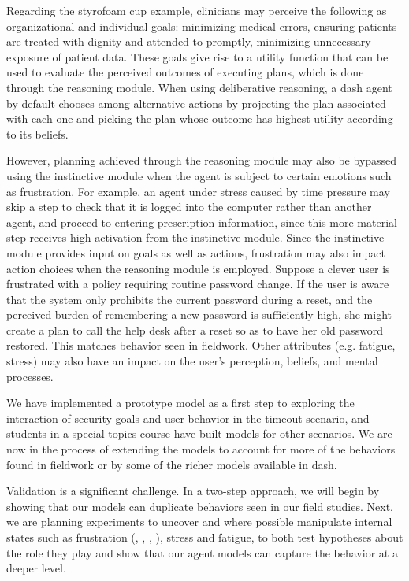 \documentclass{acm_proc_article-sp}
\newcommand{\ignore}[1] {}
\begin{document}
Regarding the styrofoam cup example, clinicians may perceive the
following as organizational and individual goals: minimizing medical
errors, ensuring patients are treated with dignity and attended to
promptly, minimizing unnecessary exposure of patient
data. \ignore{Individual goals may include things like providing
  superior patient care and finishing the current task adequately but
  quickly.}  These goals give rise to a utility function that can be
used to evaluate the perceived outcomes of executing plans, which is
done through the reasoning module. When using deliberative reasoning,
a {\sc dash} agent by default chooses among alternative actions by
projecting the plan associated with each one and picking the plan
whose outcome has highest utility according to its beliefs.

However, planning achieved through the reasoning module may also be
bypassed using the instinctive module when the agent is subject to
certain emotions such as frustration. For example, an agent under
stress caused by time pressure may skip a step to check that it is
logged into the computer rather than another agent, and proceed to
entering prescription information, since this more material step
receives high activation from the instinctive module. Since the
instinctive module provides input on goals as well as actions,
frustration may also impact action choices when the reasoning module
is employed. Suppose a clever user is frustrated with a policy
requiring routine password change. If the user is aware that the
system only prohibits the current password during a reset, and the
perceived burden of remembering a new password is sufficiently high,
she might create a plan to call the help desk after a reset so as to
have her old password restored. This matches behavior seen in
fieldwork.  Other attributes (e.g. fatigue, stress) may also have an
impact on the user's perception, beliefs, and mental processes.
 
We have implemented a prototype model as a first step to exploring the
interaction of security goals and user behavior in the timeout
scenario, and students in a special-topics course have built models
for other scenarios. We are now in the process of extending the models
to account for more of the behaviors found in fieldwork or by some of
the richer models available in {\sc dash}.

Validation is a significant challenge. In a two-step approach, we will
begin by showing that our models can duplicate behaviors seen in our
field studies. Next, we are planning experiments to uncover and where
possible manipulate internal states such as frustration
(\cite{hazlett2003measurement}, \cite{kapoor2007automatic},
\cite{klein2002computer}, \cite{reynolds2001sensing}), stress and
fatigue, to both test hypotheses about the role they play and show
that our agent models can capture the behavior at a deeper level.
\end{document}
